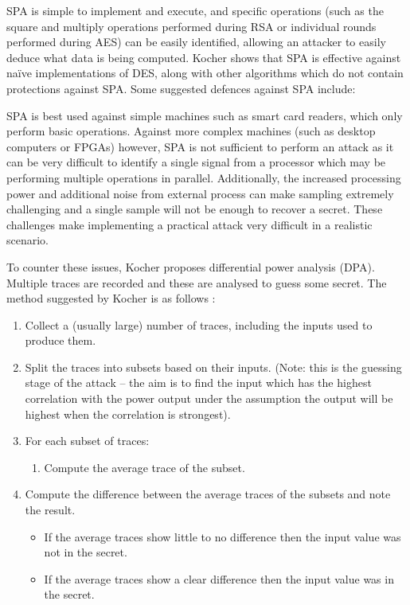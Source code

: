 \documentclass[a4paper,oneside,11pt]{article}
\begin{document}
SPA is simple to implement and execute, and specific operations (such as the
square and multiply operations performed during RSA or individual rounds
performed during AES) can be easily identified, allowing an attacker to easily
deduce what data is being computed. Kocher shows that SPA is effective against
na{\"i}ve implementations of DES, along with other algorithms which do not
contain protections against SPA. Some suggested defences against SPA include:

SPA is best used against simple machines such as smart card readers, which only
perform basic operations. Against more complex machines (such as desktop
computers or FPGAs) however, SPA is not sufficient to perform an attack as it
can be very difficult to identify a single signal from a processor which may be
performing multiple operations in parallel. Additionally, the increased
processing power and additional noise from external process can make sampling
extremely challenging and a single sample will not be enough to recover a
secret. These challenges make implementing a practical attack very difficult in
a realistic scenario.

To counter these issues, Kocher proposes differential power analysis (DPA).
Multiple traces are recorded and these are analysed to guess some secret.
The method suggested by Kocher is as follows \cite{A/Kocher-2011-DPA}:

\begin{enumerate}
	\item{Collect a (usually large) number of traces, including the inputs
		used to produce them.}
	\item{Split the traces into subsets based on their inputs. (Note: this
		is the guessing stage of the attack -- the aim is to find the
		input which has the highest correlation with the power output
		under the assumption the output will be highest when the
		correlation is strongest).}
	\item{For each subset of traces:}
		\begin{enumerate}
			\item{Compute the average trace of the subset.}
		\end{enumerate}
	\item{Compute the difference between the average traces of the subsets
		and note the result.}
		\begin{itemize}
			\item{If the average traces show little to no
				difference then the input value was not in the
				secret.}
			\item{If the average traces show a clear difference
				then the input value was in the secret.}
		\end{itemize}
\end{enumerate}
\end{document}
